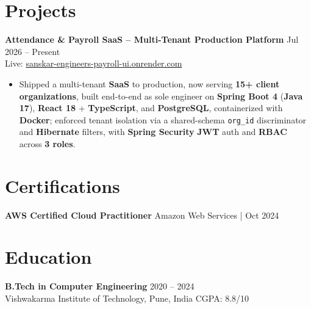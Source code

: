 \documentclass[a4paper,10pt]{article}
\begin{document}
\section*{Projects}

\textbf{Attendance \& Payroll SaaS -- Multi-Tenant Production Platform} \hfill Jul 2026 -- Present \\
Live: \href{https://sanskar-engineers-payroll-ui.onrender.com/login}{sanskar-engineers-payroll-ui.onrender.com}
\begin{itemize}[leftmargin=*]
    \item Shipped a multi-tenant \textbf{SaaS} to production, now serving \textbf{15+ client organizations}, built end-to-end as sole engineer on \textbf{Spring Boot 4} (\textbf{Java 17}), \textbf{React 18} + \textbf{TypeScript}, and \textbf{PostgreSQL}, containerized with \textbf{Docker}; enforced tenant isolation via a shared-schema \texttt{org\_id} discriminator and \textbf{Hibernate} filters, with \textbf{Spring Security} \textbf{JWT} auth and \textbf{RBAC} across \textbf{3 roles}.
\end{itemize}

\section*{Certifications}
\textbf{AWS Certified Cloud Practitioner} \hfill Amazon Web Services \;|\; Oct 2024

\section*{Education}
\textbf{B.Tech in Computer Engineering} \hfill 2020 -- 2024 \\
Vishwakarma Institute of Technology, Pune, India \hfill CGPA: 8.8/10
\end{document}
